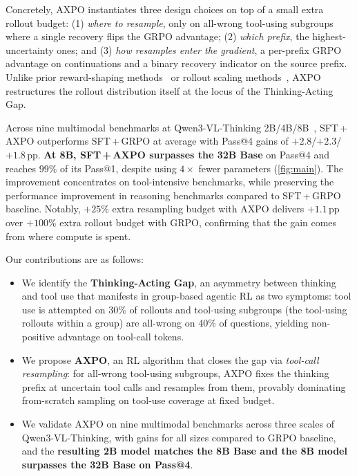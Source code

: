 \documentclass{llmxive}
\providecommand{\gap}{Thinking-Acting Gap\xspace}
\providecommand{\toolresample}{tool-call resampling\xspace}
\providecommand{\dPassFourTwoB}{$+2.8$}
\providecommand{\dPassFourFourB}{$+2.3$}
\providecommand{\dPassFourEightB}{$+1.8$}
\providecommand{\eightBPassOneReachPct}{$99\%$}
\begin{document}
Concretely, AXPO instantiates three design choices on top of a small extra rollout budget: (1) \emph{where to resample}, only on all-wrong tool-using subgroups where a single recovery flips the GRPO advantage;
(2) \emph{which prefix}, the highest-uncertainty ones; and (3) \emph{how resamples enter the gradient}, a per-prefix GRPO advantage on continuations and a binary recovery indicator on the source prefix.
Unlike prior reward-shaping methods~\citep{pyvision-rl, deepeyesv2, otc} or rollout scaling methods~\citep{brorl, arpo}, AXPO restructures the rollout distribution itself at the locus of the \gap.

Across nine multimodal benchmarks at Qwen3-VL-Thinking 2B/4B/8B~\citep{Qwen3VL}, SFT\,+\,AXPO outperforms SFT\,+\,GRPO at average with Pass@4 gains of \dPassFourTwoB/\dPassFourFourB/\dPassFourEightB\,pp.
\textbf{At 8B, SFT\,+\,AXPO surpasses the 32B Base} on Pass@4 and reaches \eightBPassOneReachPct{} of its Pass@1, despite using $4\times$ fewer parameters (\autoref{fig:main}). The improvement concentrates on tool-intensive benchmarks, while preserving the performance improvement in reasoning benchmarks compared to SFT\,+\,GRPO baseline. Notably, $+25\%$ extra resampling budget with AXPO delivers $+1.1$\,pp over $+100\%$ extra rollout budget with GRPO, confirming that the gain comes from where compute is spent.

Our contributions are as follows:
\begin{itemize}[leftmargin=*, itemsep=2pt]
    \item We identify the \textbf{\gap}, an asymmetry between thinking and tool use that manifests in group-based agentic RL as two symptoms: tool use is attempted on 30\% of rollouts and tool-using subgroups (the tool-using rollouts within a group) are all-wrong on 40\% of questions, yielding non-positive advantage on tool-call tokens.
    \item We propose \textbf{AXPO}, an RL algorithm that closes the gap via \emph{\toolresample}: for all-wrong tool-using subgroups, AXPO fixes the thinking prefix at uncertain tool calls and resamples from them, provably dominating from-scratch sampling on tool-use coverage at fixed budget.
    \item We validate AXPO on nine multimodal benchmarks across three scales of Qwen3-VL-Thinking, with gains for all sizes compared to GRPO baseline, and the \textbf{resulting 2B model matches the 8B Base and the 8B model surpasses the 32B Base on Pass@4}.
\end{itemize}
\end{document}
